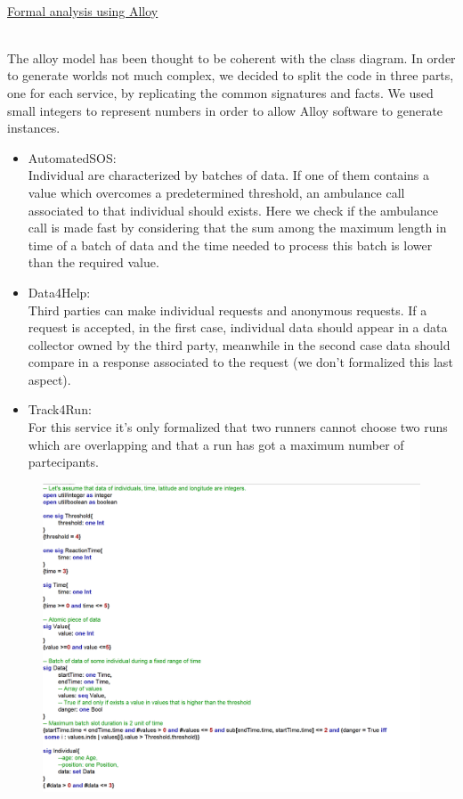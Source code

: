 \documentclass{article}
\begin{document}
\begin{legal}
\begin{legal}
\begin{legal}
			\\
		\end{legal}
		\end{legal}
	\newpage
	\item \underline{Formal analysis using Alloy}\\\\
	{\normalfont
	The alloy model has been thought to be coherent with the class diagram. In order to generate worlds not much complex, we decided to split the code in three parts, one for each service, by replicating the common signatures and facts. We used small integers to represent numbers in order to allow Alloy software to generate instances. 
		\begin{itemize}
		\item AutomatedSOS:\\Individual are characterized by batches of data. If one of them contains a value which overcomes a predetermined threshold, an ambulance call associated to that individual should exists. Here we check if the ambulance call is made fast by considering that the sum among the maximum length in time of a batch of data and the time needed to process this batch is lower than the required value.
		\item Data4Help:\\Third parties can make individual requests and anonymous requests. If a request is accepted, in the first case, individual data should appear in a data collector owned by the third party, meanwhile in the second case data should compare in a response associated to the request (we don't formalized this last aspect).
		\item Track4Run:\\For this service it's only formalized that two runners cannot choose two runs which are overlapping and that a run has got a maximum number of partecipants.
		\end{itemize}
		} 
		\begin{figure}[H]
			\newpage
			\includegraphics[width=\linewidth]{../images/alloy/code/automated_1.PNG}

\end{figure}
\end{legal}
\end{document}
